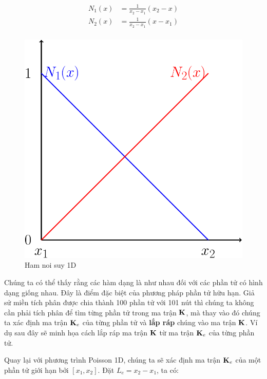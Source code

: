 \begin{equation}\label{eq_shape1D}
    \begin{aligned}
        N_1(x) &= \frac{1}{x_2-x_1}\left(x_2-x\right) \\
        N_2(x) &= \frac{1}{x_2-x_1}\left(x-x_1\right) \\
    \end{aligned}
\end{equation}

\begin{figure}[htbp]
    \centering
    \includegraphics[width=0.3\linewidth]{Tuan6/figure/shape_func.pdf}
    \caption{Ham noi suy 1D}
    \label{fig_shape_func}
\end{figure}

Chúng ta có thể thấy rằng các hàm dạng là như nhau đối với các phần tử có hình dạng giống nhau. Đây là điểm đặc biệt của phương pháp phần tử hữu hạn. Giả sử miền tích phân được chia thành 100 phần tử với 101 nút thì chúng ta không cần phải tích phân để tìm từng phần tử trong ma trận ${\bf K}$, mà thay vào đó chúng ta xác định ma trận ${\bf K}_e$ của từng phần tử và \textbf{lắp ráp} chúng vào ma trận ${\bf K}$. Ví dụ sau đây sẽ minh họa cách lắp ráp ma trận ${\bf K}$ từ ma trận ${\bf K}_e$ của từng phần tử.

Quay lại với phương trình Poisson 1D, chúng ta sẽ xác định ma trận ${\bf K}_e$ của một phần tử giới hạn bởi $[x_1, x_2]$. Đặt $L_e = x_2 -x_1$, ta có:

